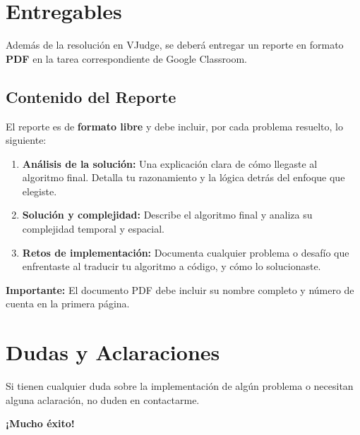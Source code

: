 \documentclass{article}
\begin{document}
\section{Entregables}
Además de la resolución en VJudge, se deberá entregar un reporte en formato \textbf{PDF} en la tarea correspondiente de Google Classroom.

\subsection{Contenido del Reporte}
El reporte es de \textbf{formato libre} y debe incluir, por cada problema resuelto, lo siguiente:
\begin{enumerate}
    \item \textbf{Análisis de la solución:} Una explicación clara de cómo llegaste al algoritmo final. Detalla tu razonamiento y la lógica detrás del enfoque que elegiste.
    \item \textbf{Solución y complejidad:} Describe el algoritmo final y analiza su complejidad temporal y espacial.
    \item \textbf{Retos de implementación:} Documenta cualquier problema o desafío que enfrentaste al traducir tu algoritmo a código, y cómo lo solucionaste.
\end{enumerate}
\textbf{Importante:} El documento PDF debe incluir su nombre completo y número de cuenta en la primera página.

\section{Dudas y Aclaraciones}
Si tienen cualquier duda sobre la implementación de algún problema o necesitan alguna aclaración, no duden en contactarme.

\bigskip 
\begin{center}
    \textbf{¡Mucho éxito!}
\end{center}
\end{document}
